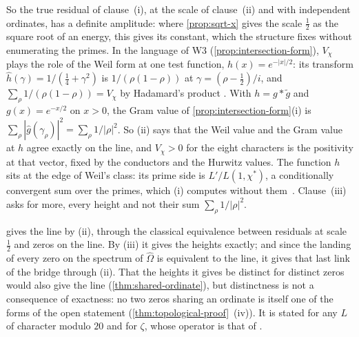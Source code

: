 So the true residual of clause~(i), at the scale of
clause~(ii) and with independent ordinates, has a
definite amplitude: where \cref{prop:sqrt-x} gives the
scale $\tfrac12$ as the square root of an energy, this
gives its constant, which the structure fixes without
enumerating the primes.  In the language of W3
(\cref{prop:intersection-form}), $V_\chi$ plays the role
of the Weil form at one test function,
$h(x)=e^{-|x|/2}$: its transform
$\hat h(\gamma)=1/(\tfrac14+\gamma^2)$ is
$1/(\rho(1-\rho))$ at $\gamma=(\rho-\tfrac12)/i$, and
$\sum_\rho1/(\rho(1-\rho))=V_\chi$ by Hadamard's product
.  With $h=g*\tilde g$ and $g(x)=e^{-x/2}$ on
$x>0$, the Gram value of
\cref{prop:intersection-form}(i) is
$\sum_\rho|\hat g(\gamma_\rho)|^2=\sum_\rho1/|\rho|^2$.
So (ii) says that the Weil value and the Gram value at
$h$ agree exactly on the line, and $V_\chi>0$ for the
eight characters is the positivity at that vector,
fixed by the conductors and the Hurwitz values.  The
function $h$ sits at the edge of Weil's class: its
prime side is $L'/L(1,\chi^*)$, a conditionally
convergent sum over the primes, which (i) computes
without them~\cite{berndt72,dilcher92}.  Clause~(iii) asks for more, every
height and not their sum $\sum_\rho1/|\rho|^2$.

\begin{corollary}\label{cor:closure}
 gives the line by (ii), through the classical equivalence between residuals
at scale $\tfrac12$ and zeros on the line.  By (iii) it gives the heights exactly; and since the
landing of every zero on the spectrum of
$\hat\Omega$ is equivalent to the line, it gives
that last link of the bridge through (ii).
  That the heights it gives be
distinct for distinct zeros would also give the line (\cref{thm:shared-ordinate}), but distinctness
is not a consequence of exactness: no two zeros sharing an ordinate is itself one of the forms of the
open statement (\cref{thm:topological-proof}~(iv)).  It is stated for any $L$ of character modulo $20$ and for $\zeta$, whose operator is
that of \cite{gonzalez25hp}.  %
\end{corollary}


